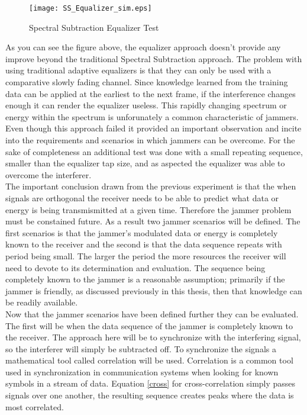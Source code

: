\begin{figure}[!ht]\label{SS_equalizer}
\centering
\texttt{[image: SS\_Equalizer\_sim.eps]}
\caption{Spectral Subtraction Equalizer Test}
\end{figure} 

As you can see the figure above, the equalizer approach doesn't provide any improve beyond the traditional Spectral Subtraction approach.  The problem with using traditional adaptive equalizers is that they can only be used with a comparative slowly fading channel.  Since knowledge learned from the training data can be applied at the earliest to the next frame, if the interference changes enough it can render the equalizer useless.  This rapidly changing spectrum or energy within the spectrum is unforunately a common characteristic of jammers.  Even though this approach failed it provided an important observation and incite into the requirements and scenarios in which jammers can be overcome.  For the sake of completeness an additional test was done with a small repeating sequence, smaller than the equalizer tap size, and as aspected the equalizer was able to overcome the interferer.\\



The important conclusion drawn from the previous experiment is that the when signals are orthogonal the receiver needs to be able to predict what data or energy is being transmismitted at a given time.  Therefore the jammer problem must be constained future.  As a result two jammer scenarios will be defined.  The first scenarios is that the jammer's modulated data or energy is completely known to the receiver and the second is that the data sequence repeats with period being small.  The larger the period the more resources the receiver will need to devote to its determination and evaluation.  The sequence being completely known to the jammer is a reasonable assumption; primarily if the jammer is friendly, as discussed previously in this thesis, then that knowledge can be readily available.\\

Now that the jammer scenarios have been defined further they can be evaluated.  The first will be when the data sequence of the jammer is completely known to the receiver.  The approach here will be to synchronize with the interfering signal, so the interferer will simply be subtracted off.  To synchronize the signals a mathematical tool called correlation will be used.  Correlation is a common tool used in synchronization in communication systems when looking for known symbols in a stream of data.  Equation \ref{cross} for cross-correlation simply passes signals over one another, the resulting sequence creates peaks where the data is most correlated.\\

